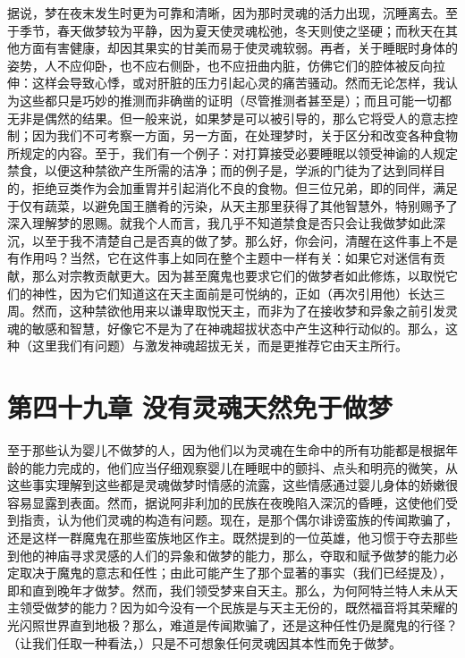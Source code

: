 据说，梦在夜末发生时更为可靠和清晰，因为那时灵魂的活力出现，沉睡离去。至于季节，春天做梦较为平静，因为夏天使灵魂松弛，冬天则使之坚硬；而秋天在其他方面有害健康，却因其果实的甘美而易于使灵魂软弱。再者，关于睡眠时身体的姿势，人不应仰卧，也不应右侧卧，也不应扭曲内脏，仿佛它们的腔体被反向拉伸：这样会导致心悸，或对肝脏的压力引起心灵的痛苦骚动。然而无论怎样，我认为这些都只是巧妙的推测而非确凿的证明（尽管推测者甚至是）；而且可能一切都无非是偶然的结果。但一般来说，如果梦是可以被引导的，那么它将受人的意志控制；因为我们不可考察一方面，另一方面，在处理梦时，关于区分和改变各种食物所规定的内容。至于，我们有一个例子：对打算接受必要睡眠以领受神谕的人规定禁食，以便这种禁欲产生所需的洁净；而的例子是，学派的门徒为了达到同样目的，拒绝豆类作为会加重胃并引起消化不良的食物。但三位兄弟，即的同伴，满足于仅有蔬菜，以避免国王膳肴的污染，从天主那里获得了其他智慧外，特别赐予了深入理解梦的恩赐。就我个人而言，我几乎不知道禁食是否只会让我做梦如此深沉，以至于我不清楚自己是否真的做了梦。那么好，你会问，清醒在这件事上不是有作用吗？当然，它在这件事上如同在整个主题中一样有关：如果它对迷信有贡献，那么对宗教贡献更大。因为甚至魔鬼也要求它们的做梦者如此修炼，以取悦它们的神性，因为它们知道这在天主面前是可悦纳的，正如（再次引用他）长达三周。然而，这种禁欲他用来以谦卑取悦天主，而非为了在接收梦和异象之前引发灵魂的敏感和智慧，好像它不是为了在神魂超拔状态中产生这种行动似的。那么，这种（这里我们有问题）与激发神魂超拔无关，而是更推荐它由天主所行。\par


\section{第四十九章 没有灵魂天然免于做梦}

至于那些认为婴儿不做梦的人，因为他们以为灵魂在生命中的所有功能都是根据年龄的能力完成的，他们应当仔细观察婴儿在睡眠中的颤抖、点头和明亮的微笑，从这些事实理解到这些都是灵魂做梦时情感的流露，这些情感通过婴儿身体的娇嫩很容易显露到表面。然而，据说阿非利加的民族在夜晚陷入深沉的昏睡，这使他们受到指责，认为他们灵魂的构造有问题。现在，是那个偶尔诽谤蛮族的传闻欺骗了，还是这样一群魔鬼在那些蛮族地区作主。既然提到的一位英雄，他习惯于夺去那些到他的神庙寻求灵感的人们的异象和做梦的能力，那么，夺取和赋予做梦的能力必定取决于魔鬼的意志和任性；由此可能产生了那个显著的事实（我们已经提及），即和直到晚年才做梦。然而，我们领受梦来自天主。那么，为何阿特兰特人未从天主领受做梦的能力？因为如今没有一个民族是与天主无份的，既然福音将其荣耀的光闪照世界直到地极？那么，难道是传闻欺骗了，还是这种任性仍是魔鬼的行径？（让我们任取一种看法，）只是不可想象任何灵魂因其本性而免于做梦。\par

